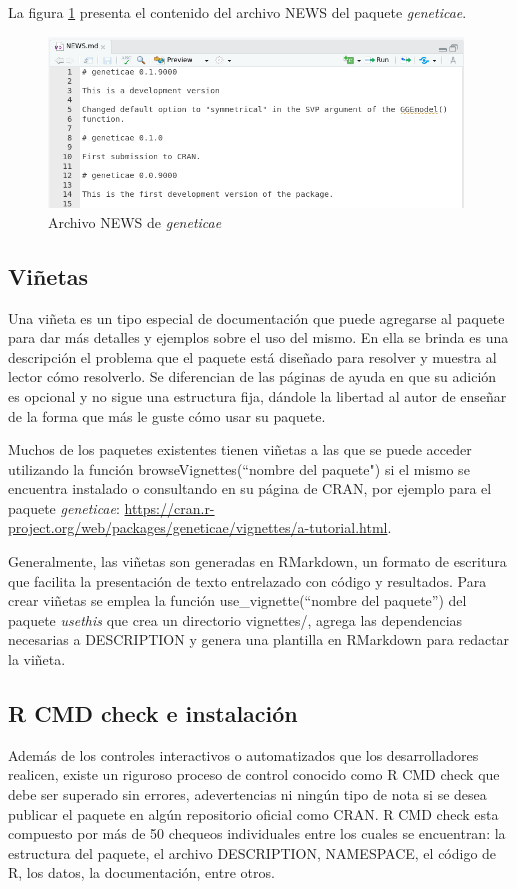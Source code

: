 La figura \ref{fig:fig39} presenta el contenido del archivo NEWS del paquete \emph{geneticae}.

\begin{figure}[h]
	\begin{center}
		\includegraphics[width=11cm]{./Graficos/News.png}	
	\end{center}
	\caption{Archivo NEWS de \emph{geneticae}}
	\label{fig:fig39}
\end{figure}


\subsection{Viñetas}

Una viñeta es un tipo especial de documentación que puede agregarse al paquete para dar más detalles y ejemplos sobre el uso del mismo. En ella se brinda es una descripción el problema que el paquete está diseñado para resolver y muestra al lector cómo resolverlo. Se diferencian de las páginas de ayuda en que su adición es opcional y no sigue una estructura fija, dándole la libertad al autor de enseñar de la forma que más le guste cómo usar su paquete. 


Muchos de los paquetes existentes tienen viñetas a las que se puede acceder utilizando la función \textcolor{fandango}{browseVignettes(``nombre del paquete")} si el mismo se encuentra instalado o consultando en su página de CRAN, por ejemplo para el paquete \emph{geneticae}: \url{https://cran.r-project.org/web/packages/geneticae/vignettes/a-tutorial.html}.

Generalmente, las viñetas son generadas en RMarkdown, un formato de escritura que facilita la presentación de texto entrelazado con código y resultados. Para crear viñetas se emplea la función \textcolor{fandango}{use\_vignette(``nombre del paquete'')} del paquete \emph{usethis} que crea un directorio vignettes/, agrega las dependencias necesarias a DESCRIPTION y genera una plantilla en RMarkdown para redactar la viñeta. 


\subsection{R CMD check e instalación}
Además de los controles interactivos o automatizados que los desarrolladores realicen, existe un riguroso proceso de control conocido como R CMD check que debe ser superado sin errores, adevertencias ni ningún tipo de nota si se desea publicar el paquete en algún repositorio oficial como CRAN. R CMD check esta compuesto por más de 50 chequeos individuales entre los cuales se encuentran: la estructura del paquete, el archivo DESCRIPTION, NAMESPACE, el código de R, los datos, la documentación, entre otros.  

